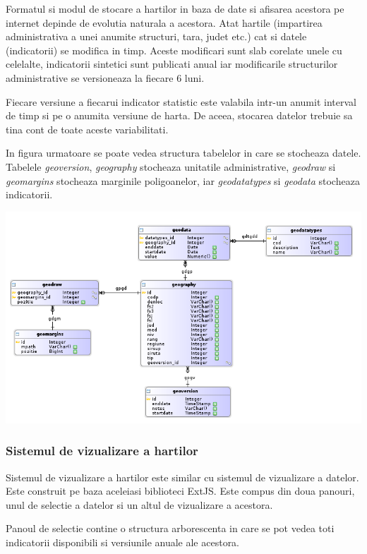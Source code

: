 \documentclass[a4paper, 10pt]{article}
\begin{document}
{Formatul si modul de stocare a hartilor in baza de date si afisarea acestora pe internet depinde de evolutia naturala a acestora. Atat hartile (impartirea administrativa a unei anumite structuri, tara, judet etc.) cat si datele (indicatorii) se modifica in timp. 
Aceste modificari sunt slab corelate unele cu celelalte, indicatorii sintetici sunt publicati anual iar modificarile structurilor administrative se versioneaza la fiecare 6 luni. 

Fiecare versiune a fiecarui indicator statistic este valabila intr-un anumit interval de timp si pe o anumita versiune de harta. De aceea, stocarea datelor trebuie sa tina cont de toate aceste variabilitati. 

In figura urmatoare se poate vedea structura tabelelor in care se stocheaza datele. 
Tabelele \emph{geoversion}, \emph{geography} stocheaza unitatile administrative, 
\emph{geodraw} si \emph{geomargins} stocheaza marginile poligoanelor, 
iar \emph{geodatatypes} si \emph{geodata} stocheaza indicatorii. 

\includegraphics[width=\textwidth]{img/geo-database}

\subsubsection{Sistemul de vizualizare a hartilor}

Sistemul de vizualizare a hartilor este similar cu sistemul de vizualizare a datelor. Este construit pe baza aceleiasi biblioteci ExtJS. Este compus din doua panouri, unul de selectie a datelor si un altul de vizualizare a acestora. 

Panoul de selectie contine o structura arborescenta in care se pot vedea toti indicatorii disponibili si versiunile anuale ale acestora. 

}
\end{document}
